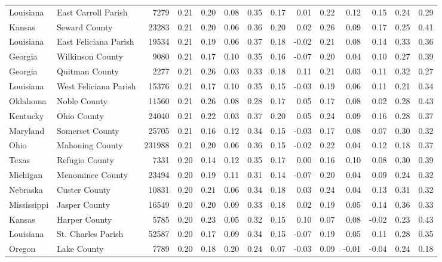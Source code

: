 \documentclass[10pt, letterpaper]{article}
\begin{document}
\begin{spacing}{1.4}
\begin{table}
{\begin{tabular}{llrrrrrrrrrrrr}
Louisiana & East Carroll Parish & 7279 & 0.21 & 0.20 & 0.08 & 0.35 & 0.17 & 0.01 & 0.22 & 0.12 & 0.15 & 0.24 & 0.29 \\
Kansas & Seward County & 23283 & 0.21 & 0.20 & 0.06 & 0.36 & 0.20 & 0.02 & 0.26 & 0.09 & 0.17 & 0.25 & 0.41 \\
Louisiana & East Feliciana Parish & 19534 & 0.21 & 0.19 & 0.06 & 0.37 & 0.18 & -0.02 & 0.21 & 0.08 & 0.14 & 0.33 & 0.36 \\
Georgia & Wilkinson County & 9080 & 0.21 & 0.17 & 0.10 & 0.35 & 0.16 & -0.07 & 0.20 & 0.04 & 0.10 & 0.27 & 0.39 \\
Georgia & Quitman County & 2277 & 0.21 & 0.26 & 0.03 & 0.33 & 0.18 & 0.11 & 0.21 & 0.03 & 0.11 & 0.32 & 0.27 \\
Louisiana & West Feliciana Parish & 15376 & 0.21 & 0.17 & 0.10 & 0.35 & 0.15 & -0.03 & 0.19 & 0.06 & 0.11 & 0.21 & 0.34 \\
Oklahoma & Noble County & 11560 & 0.21 & 0.26 & 0.08 & 0.28 & 0.17 & 0.05 & 0.17 & 0.08 & 0.02 & 0.28 & 0.43 \\
Kentucky & Ohio County & 24040 & 0.21 & 0.22 & 0.03 & 0.37 & 0.20 & 0.05 & 0.24 & 0.09 & 0.16 & 0.28 & 0.37 \\
Maryland & Somerset County & 25705 & 0.21 & 0.16 & 0.12 & 0.34 & 0.15 & -0.03 & 0.17 & 0.08 & 0.07 & 0.30 & 0.32 \\
Ohio & Mahoning County & 231988 & 0.21 & 0.20 & 0.06 & 0.36 & 0.15 & -0.02 & 0.22 & 0.04 & 0.12 & 0.18 & 0.37 \\
Texas & Refugio County & 7331 & 0.20 & 0.14 & 0.12 & 0.35 & 0.17 & 0.00 & 0.16 & 0.10 & 0.08 & 0.30 & 0.39 \\
Michigan & Menominee County & 23494 & 0.20 & 0.19 & 0.11 & 0.31 & 0.14 & -0.07 & 0.20 & 0.04 & 0.09 & 0.24 & 0.32 \\
Nebraska & Custer County & 10831 & 0.20 & 0.21 & 0.06 & 0.34 & 0.18 & 0.03 & 0.24 & 0.04 & 0.13 & 0.31 & 0.32 \\
Mississippi & Jasper County & 16549 & 0.20 & 0.20 & 0.09 & 0.33 & 0.18 & 0.02 & 0.19 & 0.05 & 0.14 & 0.36 & 0.33 \\
Kansas & Harper County & 5785 & 0.20 & 0.23 & 0.05 & 0.32 & 0.15 & 0.10 & 0.07 & 0.08 & -0.02 & 0.23 & 0.43 \\
Louisiana & St. Charles Parish & 52587 & 0.20 & 0.17 & 0.09 & 0.34 & 0.15 & -0.07 & 0.19 & 0.05 & 0.11 & 0.28 & 0.35 \\
Oregon & Lake County & 7789 & 0.20 & 0.18 & 0.20 & 0.24 & 0.07 & -0.03 & 0.09 & -0.01 & -0.04 & 0.24 & 0.18 \\

\end{tabular}}
\end{table}
\end{spacing}
\end{document}
